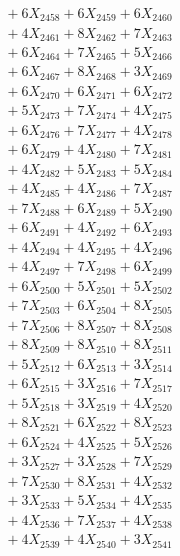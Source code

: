 \documentclass[a4paper,10pt]{article}
\begin{document}
{\begin{align}
&\;  + 6 X_{2458} + 6 X_{2459} + 6 X_{2460} \\[0.3ex]
&\;  + 4 X_{2461} + 8 X_{2462} + 7 X_{2463} \\[0.3ex]
&\;  + 6 X_{2464} + 7 X_{2465} + 5 X_{2466} \\[0.3ex]
&\;  + 6 X_{2467} + 8 X_{2468} + 3 X_{2469} \\[0.5ex]\allowbreak
&\;  + 6 X_{2470} + 6 X_{2471} + 6 X_{2472} \\[0.3ex]
&\;  + 5 X_{2473} + 7 X_{2474} + 4 X_{2475} \\[0.3ex]
&\;  + 6 X_{2476} + 7 X_{2477} + 4 X_{2478} \\[0.3ex]
&\;  + 6 X_{2479} + 4 X_{2480} + 7 X_{2481} \\[0.3ex]
&\;  + 4 X_{2482} + 5 X_{2483} + 5 X_{2484} \\[0.3ex]
&\;  + 4 X_{2485} + 4 X_{2486} + 7 X_{2487} \\[0.3ex]
&\;  + 7 X_{2488} + 6 X_{2489} + 5 X_{2490} \\[0.3ex]
&\;  + 6 X_{2491} + 4 X_{2492} + 6 X_{2493} \\[0.3ex]
&\;  + 4 X_{2494} + 4 X_{2495} + 4 X_{2496} \\[0.3ex]
&\;  + 4 X_{2497} + 7 X_{2498} + 6 X_{2499} \\[0.5ex]\allowbreak
&\;  + 6 X_{2500} + 5 X_{2501} + 5 X_{2502} \\[0.3ex]
&\;  + 7 X_{2503} + 6 X_{2504} + 8 X_{2505} \\[0.3ex]
&\;  + 7 X_{2506} + 8 X_{2507} + 8 X_{2508} \\[0.3ex]
&\;  + 8 X_{2509} + 8 X_{2510} + 8 X_{2511} \\[0.3ex]
&\;  + 5 X_{2512} + 6 X_{2513} + 3 X_{2514} \\[0.3ex]
&\;  + 6 X_{2515} + 3 X_{2516} + 7 X_{2517} \\[0.3ex]
&\;  + 5 X_{2518} + 3 X_{2519} + 4 X_{2520} \\[0.3ex]
&\;  + 8 X_{2521} + 6 X_{2522} + 8 X_{2523} \\[0.3ex]
&\;  + 6 X_{2524} + 4 X_{2525} + 5 X_{2526} \\[0.3ex]
&\;  + 3 X_{2527} + 3 X_{2528} + 7 X_{2529} \\[0.5ex]\allowbreak
&\;  + 7 X_{2530} + 8 X_{2531} + 4 X_{2532} \\[0.3ex]
&\;  + 3 X_{2533} + 5 X_{2534} + 4 X_{2535} \\[0.3ex]
&\;  + 4 X_{2536} + 7 X_{2537} + 4 X_{2538} \\[0.3ex]
&\;  + 4 X_{2539} + 4 X_{2540} + 3 X_{2541} \\[0.3ex]

\end{align}}
\end{document}
